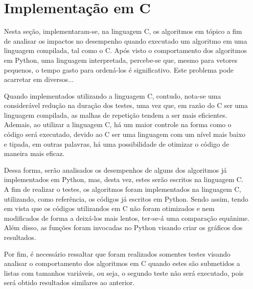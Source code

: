 \section{Implementação em C}
Nesta seção, implementaram-se, na linguagem C, os algoritmos em tópico a fim de analisar os impactos no desempenho quando executado um algoritmo em uma linguagem compilada, tal como o C.
Após visto o comportamento dos algoritmos em Python, uma linguagem interpretada, percebe-se que, mesmo para vetores pequenos, o tempo gasto para ordená-los é significativo. Este problema pode acarretar em diversos...

Quando implementados utilizando a linguagem C, contudo, nota-se uma considerável redução na duração dos testes, uma vez que, em razão do C ser uma linguagem compilada, as malhas de repetição tendem a ser mais eficientes.
Ademais, ao utilizar a linguagem C, há um maior controle na forma como o código será executado, devido ao C ser uma linguagem com um nível mais baixo e tipada, em outras palavras, há uma possibilidade de otimizar o código de maneira mais eficaz.


Dessa forma, serão analisados os desempenhos de alguns dos algoritmos já implementados em Python, mas, desta vez, estes serão escritos na linguagem C.
A fim de realizar o testes, os algoritmos foram implementados na linguagem C, utilizando, como referência, os códigos já escritos em Python. Sendo assim, tendo em vista que os códigos utilizandos em C não foram otimizados e nem modificados de forma a deixá-los mais lentos, ter-se-á uma comparação equânime.
Além disso, as funções foram invocadas no Python visando criar os gráficos dos resultados.

Por fim, é necessário ressaltar que foram realizados somentes testes visando analisar o comportamento dos algoritmos em C quando estes são submetidos a listas com tamanhos variáveis, ou seja, o segundo teste não será executado, pois será obtido resultados similares ao anterior.

\newpage
